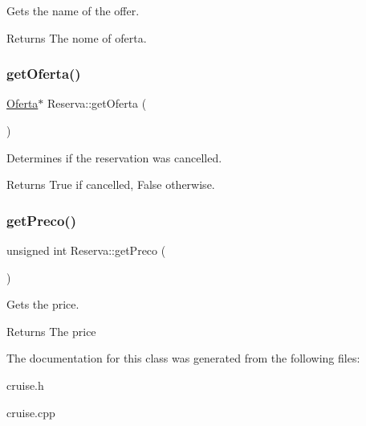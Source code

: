 Gets the name of the offer. 

\begin{DoxyReturn}{Returns}
The nome of oferta. 
\end{DoxyReturn}
\mbox{\label{classReserva_ac7fb69d14f442f58961bd337267bd92d}} 
\subsubsection{\texorpdfstring{get\+Oferta()}{getOferta()}}
{\footnotesize\ttfamily \hyperlink{classOferta}{Oferta}$\ast$ Reserva\+::get\+Oferta (\begin{DoxyParamCaption}{ }\end{DoxyParamCaption})\hspace{0.3cm}{\ttfamily [inline]}}



Determines if the reservation was cancelled. 

\begin{DoxyReturn}{Returns}
True if cancelled, False otherwise. 
\end{DoxyReturn}
\mbox{\label{classReserva_a7d6a55cda46a28d62af5870c98cbc3d5}} 
\subsubsection{\texorpdfstring{get\+Preco()}{getPreco()}}
{\footnotesize\ttfamily unsigned int Reserva\+::get\+Preco (\begin{DoxyParamCaption}{ }\end{DoxyParamCaption})\hspace{0.3cm}{\ttfamily [inline]}}



Gets the price. 

\begin{DoxyReturn}{Returns}
The price 
\end{DoxyReturn}


The documentation for this class was generated from the following files\+:\begin{DoxyCompactItemize}
\item 
cruise.\+h\item 
cruise.\+cpp\end{DoxyCompactItemize}
